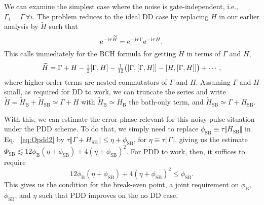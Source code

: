 \documentclass[twocolumn,pra,superscriptaddress]{revtex4-2}
\newcommand{\ep}{\Phi_\mathrm{SB}}
\newcommand{\phiSB}{\phi_\mathrm{SB}}
\newcommand{\phiB}{\phi_\mathrm{B}}
\begin{document}
We can examine the simplest case where the noise is gate-independent, i.e., $\Gamma_i=\Gamma\,\forall i$. The problem reduces to the ideal DD case by replacing $H$ in our earlier analysis by $\widetilde H$ such that
\begin{equation}
\mathrm{e}^{-\mathrm{i}\tau \widetilde H}=\mathrm{e}^{-\mathrm{i}\tau\Gamma}\mathrm{e}^{-\mathrm{i}\tau H}.
\end{equation}
This calls immediately for the BCH formula for getting $\widetilde H$ in terms of $\Gamma$ and $H$,
\begin{equation}\label{eq:BCH_Htilde}
\widetilde H = \Gamma +  H - \tfrac{\mathrm{i}}{2} [\Gamma,H]
    -\tfrac{1}{12}\bigl([\Gamma,[\Gamma,H]]-[H,[\Gamma,H]]\bigr) + \cdots,
\end{equation}
where higher-order terms are nested commutators of $\Gamma$ and $H$.
Assuming $\Gamma$ and $H$ small, as required for DD to work, we can truncate the series and write $\widetilde H=\widetilde H_\mathrm{B}+\widetilde H_\mathrm{SB}\simeq \Gamma+H$ with $\widetilde H_\mathrm{B}\simeq H_\mathrm{B}$ the bath-only term, and $\widetilde H_\mathrm{SB}\simeq \Gamma+H_\mathrm{SB}$. 

With this, we can estimate the error phase relevant for this noisy-pulse situation under the PDD scheme. To do that, we simply need to replace $\phiSB\equiv \tau\Vert H_\mathrm{SB}\Vert$ in Eq. ~\eqref{eq:Opdd2} by $\tau\Vert \Gamma +H_\mathrm{SB}\Vert\leq \eta + \phiSB$, for $\eta\equiv \tau\Vert\Gamma\Vert$, giving us the estimate $\ep\lesssim 12\phiB(\eta+\phiSB)+4(\eta+\phiSB)^2$. For PDD to work, then, it suffices to require
\begin{equation}
12\phiB(\eta+\phiSB)+4(\eta+\phiSB)^2\leq \phiSB.
\end{equation}
This gives us the condition for the break-even point, a joint requirement on $\phiB$, $\phiSB$, and $\eta$ such that PDD improves on the no DD case.
\end{document}
